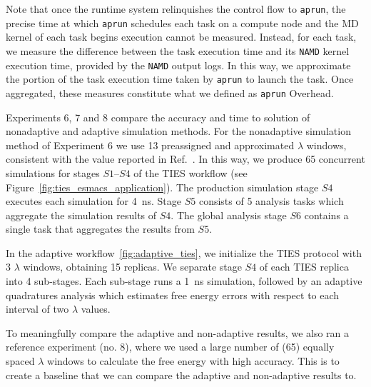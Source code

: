 Note that once the runtime system relinquishes the control flow to
\texttt{aprun}, the precise time at which \texttt{aprun} schedules each task
on a compute node and the MD kernel of each task begins execution cannot be
measured. Instead, for each task, we measure the difference between the task
execution time and its \texttt{NAMD} kernel execution time, provided by the
\texttt{NAMD} output logs. In this way, we approximate the portion of the
task execution time taken by \texttt{aprun} to launch the task. Once
aggregated, these measures constitute what we defined as \texttt{aprun}
Overhead.

Experiments 6, 7 and 8 compare the accuracy and time to solution of
nonadaptive and adaptive simulation methods. For the nonadaptive simulation
method of Experiment 6 we use 13 preassigned and approximated $\lambda$
windows, consistent with the value reported in Ref.~\cite{Bhati2017}. In this
way, we produce 65 concurrent simulations for stages $S1$--$S4$ of the TIES
workflow (see Figure~\ref{fig:ties_esmacs_application}). The production
simulation stage $S4$ executes each simulation for \SI{4}{\nano\second}.
Stage $S5$ consists of 5 analysis tasks which aggregate the simulation
results of $S4$. The global analysis stage $S6$ contains a single task that
aggregates the results from $S5$.

In the adaptive workflow~\ref{fig:adaptive_ties}, we initialize the TIES
protocol with 3 $\lambda$ windows, obtaining 15 replicas. We separate stage
$S4$ of each TIES replica into 4 sub-stages. Each sub-stage runs a
\SI{1}{\nano\second} simulation, followed by an adaptive quadratures analysis
which estimates free energy errors with respect to each interval of two
$\lambda$ values.


To meaningfully compare the adaptive and non-adaptive results, we also ran a
reference experiment (no. 8), where we used a large number of (65) equally
spaced $\lambda$ windows to calculate the free energy with high accuracy. This
is to create a baseline that we can compare the adaptive and non-adaptive
results to.

